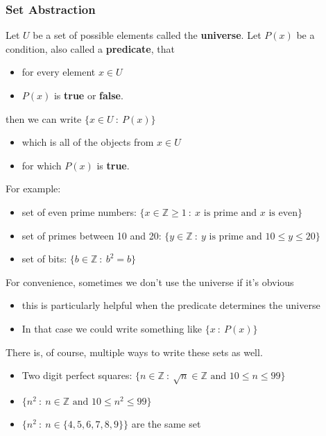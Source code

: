 \documentclass[10pt]{article}
\begin{document}
\subsubsection*{Set Abstraction}
Let $U$ be a set of possible elements called the \textbf{universe}.  Let $P(x)$ be a condition, also called a \textbf{predicate}, that
\begin{itemize}
	\item for every element $x \in U$
	\item $P(x)$ is \textbf{true} or \textbf{false}.
\end{itemize}
then we can write $\{x \in U \::\: P(x)\}$
\begin{itemize}
	\item which is all of the objects from $x \in U$
	\item for which $P(x)$ is \textbf{true}.
\end{itemize}
For example:
\begin{itemize}
	\item set of even prime numbers: $\{x \in \mathbb{Z} \geq 1\::\: \text{$x$ is prime and $x$ is even}\}$
	\item set of primes between 10 and 20: $\{y \in \mathbb{Z} \::\: \text{$y$ is prime and $10 \leq y \leq 20$}\}$
	\item set of bits: $\{b \in \mathbb{Z} \::\: b^2 = b\}$
\end{itemize}
For convenience, sometimes we don't use the universe if it's obvious
\begin{itemize}
	\item this is particularly helpful when the predicate determines the universe
	\item In that case we could write something like $\{x \::\: P(x)\}$
\end{itemize}
There is, of course, multiple ways to write these sets as well.
\begin{itemize}
	\item Two digit perfect squares: $\{n \in \mathbb{Z} \::\: \sqrt{n} \in \mathbb{Z} \text{ and } 10 \leq n \leq 99\}$
	\item $\{n^2 \::\: n \in \mathbb{Z} \text{ and } 10 \leq n^2 \leq 99\}$
	\item $\{n^2 \::\: n \in \{4, 5, 6, 7, 8, 9\}\}$ are the same set
\end{itemize}
\end{document}
